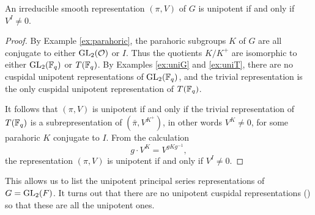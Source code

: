 \begin{prop}\label{prop:unipotent}
    An irreducible smooth representation $(\pi,V)$ of $G$ is unipotent if and only if $V^I \neq 0$.
\end{prop}
\begin{proof}
    By Example \ref{ex:parahoric}, the parahoric subgroups $K$ of $G$ are all conjugate to either $\mathrm{GL}_2(\mathcal{O})$ or $I$. Thus the quotients $K/K^+$ are isomorphic to either $\mathrm{GL}_2(\mathbb{F}_q)$ or $T(\mathbb{F}_q)$. By Examples \ref{ex:uniG} and \ref{ex:uniT}, there are no cuspidal unipotent representations of $\mathrm{GL}_2(\mathbb{F}_q)$, and the trivial representation is the only cuspidal unipotent representation of $T(\mathbb{F}_q)$.

    It follows that $(\pi,V)$ is unipotent if and only if the trivial representation of $T(\mathbb{F}_q)$ is a subrepresentation of $(\bar{\pi},V^{K^+})$, in other words $V^K \neq 0$, for some parahoric $K$ conjugate to $I$. From the calculation 
    $$g \cdot V^K = V^{gKg^{-1}},$$ the representation $(\pi,V)$ is unipotent if and only if $V^I \neq 0$.
\end{proof}

This allows us to list the unipotent principal series representations of $G=\mathrm{GL}_2(F)$. It turns out that there are no unipotent cuspidal representations (\cite[Proposition 14.3]{BH1}) so that these are all the unipotent ones.

